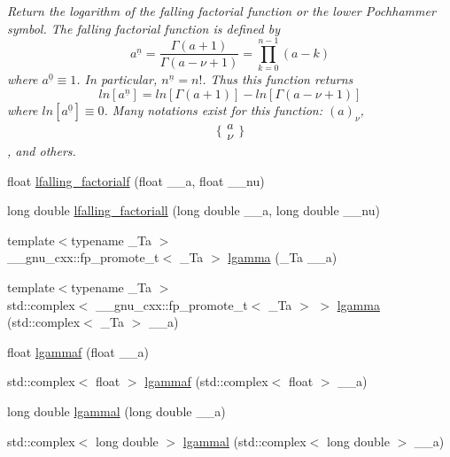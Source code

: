 \begin{DoxyCompactItemize}
\begin{DoxyCompactList}\small\item\em Return the logarithm of the falling factorial function or the lower Pochhammer symbol. The falling factorial function is defined by \[ a^{\underline{n}} = \frac{\Gamma(a + 1)}{\Gamma(a - \nu + 1)} = \prod_{k=0}^{n-1} (a - k) \] where $ a^{\underline{0}} \equiv 1 $. In particular, $ n^{\underline{n}} = n! $. Thus this function returns \[ ln[a^{\underline{n}}] = ln[\Gamma(a + 1)] - ln[\Gamma(a - \nu + 1)] \] where $ ln[a^{\underline{0}}] \equiv 0 $. Many notations exist for this function\+: $ (a)_\nu $, \[ \{ \begin{array}{c} a \\ \nu \end{array} \} \], and others. \end{DoxyCompactList}\item 
float \hyperlink{group__mathsf__gnu_ga59ad7045c90aa1e3bc671e2eb6b8a2a7}{lfalling\+\_\+factorialf} (float \+\_\+\+\_\+a, float \+\_\+\+\_\+nu)
\item 
long double \hyperlink{group__mathsf__gnu_gaa69b6c70e000b073d7f0f17199b1feb0}{lfalling\+\_\+factoriall} (long double \+\_\+\+\_\+a, long double \+\_\+\+\_\+nu)
\item 
{\footnotesize template$<$typename \+\_\+\+Ta $>$ }\\\+\_\+\+\_\+gnu\+\_\+cxx\+::fp\+\_\+promote\+\_\+t$<$ \+\_\+\+Ta $>$ \hyperlink{group__mathsf__gnu_ga40fa5127f7c419ed1d8f1c6a6f96ea9b}{lgamma} (\+\_\+\+Ta \+\_\+\+\_\+a)
\item 
{\footnotesize template$<$typename \+\_\+\+Ta $>$ }\\std\+::complex$<$ \+\_\+\+\_\+gnu\+\_\+cxx\+::fp\+\_\+promote\+\_\+t$<$ \+\_\+\+Ta $>$ $>$ \hyperlink{group__mathsf__gnu_ga93530dc48fbf301835215cdffedc42d8}{lgamma} (std\+::complex$<$ \+\_\+\+Ta $>$ \+\_\+\+\_\+a)
\item 
float \hyperlink{group__mathsf__gnu_ga37956b360838b5b2f98c8e5cfd15d307}{lgammaf} (float \+\_\+\+\_\+a)
\item 
std\+::complex$<$ float $>$ \hyperlink{group__mathsf__gnu_ga5b10ee6e92d8707a151b00086889b2ea}{lgammaf} (std\+::complex$<$ float $>$ \+\_\+\+\_\+a)
\item 
long double \hyperlink{group__mathsf__gnu_gabc66f234f4554cd5ff878792cc85bd37}{lgammal} (long double \+\_\+\+\_\+a)
\item 
std\+::complex$<$ long double $>$ \hyperlink{group__mathsf__gnu_ga5f12f60afe9a47f4ca04964f642bbf0d}{lgammal} (std\+::complex$<$ long double $>$ \+\_\+\+\_\+a)

\end{DoxyCompactItemize}
